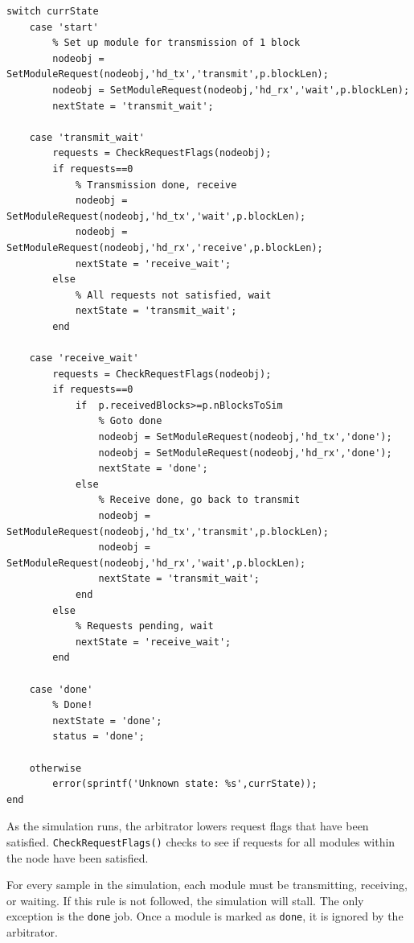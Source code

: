 \begin{lstlisting}[name=hdState]
% State machine next-state and output "logic"
switch currState
    case 'start'
        % Set up module for transmission of 1 block
        nodeobj = SetModuleRequest(nodeobj,'hd_tx','transmit',p.blockLen);
        nodeobj = SetModuleRequest(nodeobj,'hd_rx','wait',p.blockLen);
        nextState = 'transmit_wait';
        
    case 'transmit_wait'
        requests = CheckRequestFlags(nodeobj);
        if requests==0
            % Transmission done, receive
            nodeobj = SetModuleRequest(nodeobj,'hd_tx','wait',p.blockLen);
            nodeobj = SetModuleRequest(nodeobj,'hd_rx','receive',p.blockLen);
            nextState = 'receive_wait';
        else
            % All requests not satisfied, wait
            nextState = 'transmit_wait';
        end

    case 'receive_wait'
        requests = CheckRequestFlags(nodeobj);
        if requests==0 
            if  p.receivedBlocks>=p.nBlocksToSim
                % Goto done
                nodeobj = SetModuleRequest(nodeobj,'hd_tx','done');
                nodeobj = SetModuleRequest(nodeobj,'hd_rx','done');
                nextState = 'done';
            else
                % Receive done, go back to transmit
                nodeobj = SetModuleRequest(nodeobj,'hd_tx','transmit',p.blockLen);
                nodeobj = SetModuleRequest(nodeobj,'hd_rx','wait',p.blockLen);
                nextState = 'transmit_wait';
            end
        else
            % Requests pending, wait
            nextState = 'receive_wait';
        end
        
    case 'done'
        % Done!
        nextState = 'done';
        status = 'done';
                
    otherwise
        error(sprintf('Unknown state: %s',currState));
end

\end{lstlisting}

As the simulation runs, the arbitrator lowers request flags that
have been satisfied.  \verb+CheckRequestFlags()+ checks to see if
requests for all modules within the node have been satisfied.

For every sample in the simulation, each module must be
transmitting, receiving, or waiting.  If this rule is not followed,
the simulation will stall.  The only exception is the \verb+done+
job. Once a module is marked as \verb+done+, it is ignored by the
arbitrator.

